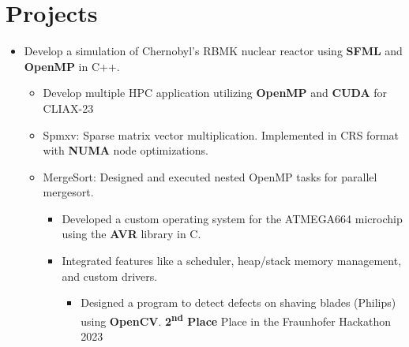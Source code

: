 \section{Projects}
{}
\begin{itemize}[leftmargin=1em]
  \item\small{Develop a simulation of Chernobyl's RBMK nuclear reactor using \textbf{SFML} and \textbf{OpenMP} in C++.}
\resumeItemListEnd

\begin{itemize}[leftmargin=1em]
  \item\small{Develop multiple HPC application utilizing \textbf{OpenMP} and \textbf{CUDA} for CLIAX-23}
  \item\small{Spmxv: Sparse matrix vector multiplication. Implemented in CRS format with \textbf{NUMA} node optimizations.}
  \item\small{MergeSort: Designed and executed nested OpenMP tasks for parallel mergesort.}
\resumeItemListEnd


\begin{itemize}[leftmargin=1em]
  \item\small{Developed a custom operating system for the ATMEGA664 microchip using the \textbf{AVR} library in C.}
  \item\small{Integrated features like a scheduler, heap/stack memory management, and custom drivers.}
\resumeItemListEnd


\begin{itemize}[leftmargin=1em]
  \item\small{Designed a program to detect defects on shaving blades (Philips) using \textbf{OpenCV}. \textbf{2\textsuperscript{nd} Place} Place in the Fraunhofer Hackathon 2023}
  \resumeItemListEnd


\end{itemize}
\end{itemize}
\end{itemize}
\end{itemize}
